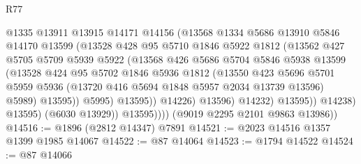 \begin{lexlean}{R77}
\begin{coremodule}
                              @1335
                              @13911
                              @13915
                              @14171
                              @14156
                              (@13568
                                @1334
                                @5686
                                @13910
                                @5846
                                @14170
                                @13599
                                (@13528
                                  @428
                                  @95
                                  @5710
                                  @1846
                                  @5922
                                  @1812
                                  (@13562
                                    @427
                                    @5705
                                    @5709
                                    @5939
                                    @5922
                                    (@13568
                                      @426
                                      @5686
                                      @5704
                                      @5846
                                      @5938
                                      @13599
                                      (@13528
                                        @424
                                        @95
                                        @5702
                                        @1846
                                        @5936
                                        @1812
                                        (@13550
                                          @423
                                          @5696
                                          @5701
                                          @5959
                                          @5936
                                          (@13720 @416 @5694 @1848 @5957 @2034 @13739 @13596)
                                          @5989)
                                        @13595))
                                    @5995)
                                  @13595))
                              @14226)
                            @13596)
                          @14232)
                        @13595))
                    @14238)
                  @13595)
                (@6030 @13929))
              @13595))))
      (@9019 @2295 @2101 @9863 @13986))
@14516 := @1896 (@2812 @14347) @7891
@14521 := @2023 @14516 @1357 @1399 @1985 @14067
@14522 := @87 @14064
@14523 := @1794 @14522
@14524 := @87 @14066

\end{coremodule}
\end{lexlean}
